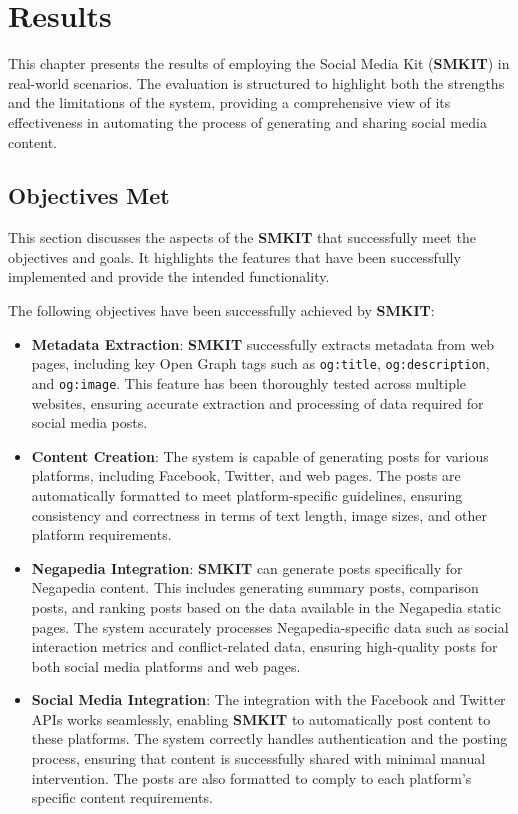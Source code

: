 
\chapter{Results}
\label{chp:results}
This chapter presents the results of employing the Social Media Kit (\textbf{SMKIT}) in real-world scenarios. The evaluation is structured to highlight both the strengths and the limitations of the system, providing a comprehensive view of its effectiveness in automating the process of generating and sharing social media content.


\section{Objectives Met}
\label{sec:objectives_met}
This section discusses the aspects of the \textbf{SMKIT} that successfully meet the objectives and goals. It highlights the features that have been successfully implemented and provide the intended functionality.

The following objectives have been successfully achieved by \textbf{SMKIT}:
\begin{itemize}
    \item \textbf{Metadata Extraction}: \textbf{SMKIT} successfully extracts metadata from web pages, including key Open Graph tags such as \texttt{og:title}, \texttt{og:description}, and \texttt{og:image}. This feature has been thoroughly tested across multiple websites, ensuring accurate extraction and processing of data required for social media posts.
    
    \item \textbf{Content Creation}: The system is capable of generating posts for various platforms, including Facebook, Twitter, and web pages. The posts are automatically formatted to meet platform-specific guidelines, ensuring consistency and correctness in terms of text length, image sizes, and other platform requirements.
    
    \item \textbf{Negapedia Integration}: \textbf{SMKIT} can generate posts specifically for Negapedia content. This includes generating summary posts, comparison posts, and ranking posts based on the data available in the Negapedia static pages. The system accurately processes Negapedia-specific data such as social interaction metrics and conflict-related data, ensuring high-quality posts for both social media platforms and web pages.
    
    \item \textbf{Social Media Integration}: The integration with the Facebook and Twitter APIs works seamlessly, enabling \textbf{SMKIT} to automatically post content to these platforms. The system correctly handles authentication and the posting process, ensuring that content is successfully shared with minimal manual intervention. The posts are also formatted to comply to each platform's specific content requirements.
\end{itemize}

